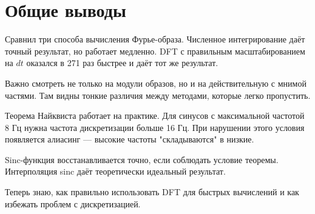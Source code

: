 \section*{Общие выводы}

Сравнил три способа вычисления Фурье-образа. Численное интегрирование даёт точный результат, но работает медленно. DFT с правильным масштабированием на $dt$ оказался в 271 раз быстрее и даёт тот же результат.

Важно смотреть не только на модули образов, но и на действительную с мнимой частями. Там видны тонкие различия между методами, которые легко пропустить.

Теорема Найквиста работает на практике. Для синусов с максимальной частотой 8 Гц нужна частота дискретизации больше 16 Гц. При нарушении этого условия появляется алиасинг — высокие частоты "складываются" в низкие.

Sinc-функция восстанавливается точно, если соблюдать условие теоремы. Интерполяция sinc даёт теоретически идеальный результат.

Теперь знаю, как правильно использовать DFT для быстрых вычислений и как избежать проблем с дискретизацией.